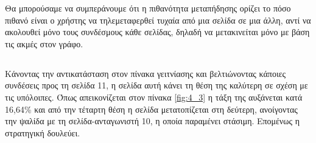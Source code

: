\documentclass[a4paper,11pt]{article}
\begin{document}
Θα μπορούσαμε να συμπεράνουμε ότι η πιθανότητα μεταπήδησης ορίζει το πόσο πιθανό είναι ο χρήστης να τηλεμεταφερθεί τυχαία από μια σελίδα σε μια άλλη, αντί να ακολουθεί μόνο τους συνδέσμους κάθε σελίδας, δηλαδή να μετακινείται μόνο με βάση τις ακμές στον γράφο. 

\subsection{} %

Κάνοντας την αντικατάσταση στον πίνακα γειτνίασης και βελτιώνοντας κάποιες συνδέσεις προς τη σελίδα 11, η σελίδα αυτή κάνει τη θέση της καλύτερη σε σχέση με τις υπόλοιπες. Όπως απεικονίζεται στον πίνακα \ref{fig:4_3} η τάξη της αυξάνεται κατά 16,64\% και από την τέταρτη θέση η σελίδα μετατοπίζεται στη δεύτερη, ανοίγοντας την ψαλίδα με τη σελίδα-ανταγωνιστή 10, η οποία παραμένει στάσιμη. Επομένως η στρατηγική δουλεύει.

\begin{table}[h]
    \centering
    \caption{Σύγκριση των τάξεων των σελίδων (5)}
    \label{fig:4_3}
\end{table}
\end{document}
